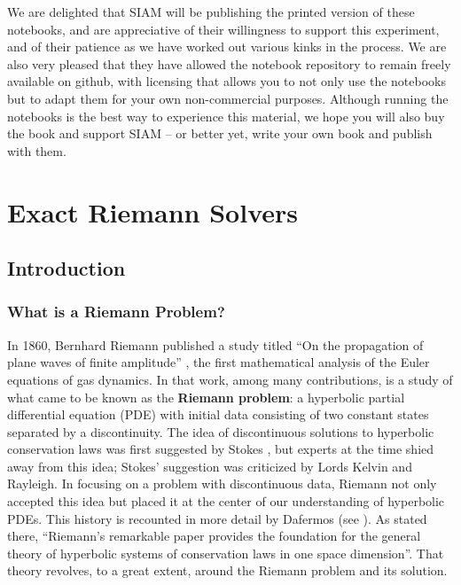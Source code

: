 \documentclass{SIAMbook2016}
\begin{document}
We are delighted that SIAM will be publishing the printed version of
these notebooks, and are appreciative of their willingness to support
this experiment, and of their patience as we have worked out various
kinks in the process. We are also very pleased that they have allowed
the notebook repository to remain freely available on github, with
licensing that allows you to not only use the notebooks but to adapt
them for your own non-commercial purposes. Although running the
notebooks is the best way to experience this material, we hope you will
also buy the book and support SIAM -- or better yet, write your own book
and publish with them.

\mainmatter

\part{Exact Riemann Solvers}

\hypertarget{introduction}{%
\chapter{Introduction}\label{introduction}}
\label{sec:01-Introduction}
\hypertarget{what-is-a-riemann-problem}{%
\section{What is a Riemann Problem?}\label{what-is-a-riemann-problem}}

In 1860, Bernhard Riemann published a study titled ``On the propagation
of plane waves of finite amplitude'' \cite{riemann1860fortpflanzung},
the first mathematical analysis of the Euler equations of gas dynamics.
In that work, among many contributions, is a study of what came to be
known as the \textbf{Riemann problem}: a hyperbolic partial differential
equation (PDE) with initial data consisting of two constant states
separated by a discontinuity. The idea of discontinuous solutions to
hyperbolic conservation laws was first suggested by Stokes
\cite{stokes1848liv}, but experts at the time shied away from this idea;
Stokes' suggestion was criticized by Lords Kelvin and Rayleigh. In
focusing on a problem with discontinuous data, Riemann not only accepted
this idea but placed it at the center of our understanding of hyperbolic
PDEs. This history is recounted in more detail by Dafermos (see
\cite{dafermos2010hyperbolic}). As stated there, ``Riemann's remarkable
paper provides the foundation for the general theory of hyperbolic
systems of conservation laws in one space dimension''. That theory
revolves, to a great extent, around the Riemann problem and its
solution.
\end{document}
